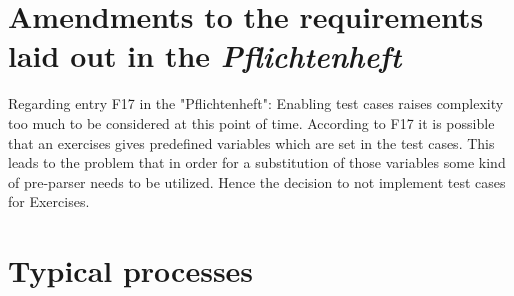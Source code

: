 \documentclass[a4paper, parskip=half]{scrartcl}
\begin{document}
\section{Amendments to the requirements laid out in the \textit{Pflichtenheft}}

Regarding entry F17 in the "Pflichtenheft":
Enabling test cases raises complexity too much to be considered at this point of time.
According to F17 it is possible that an exercises gives predefined variables which
are set in the test cases. This leads to the problem that in order for a substitution of
those variables some kind of pre-parser needs to be utilized.
Hence the decision to not implement test cases for Exercises.

\section{Typical processes}

\end{document}
